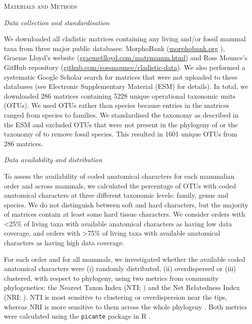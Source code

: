 \documentclass[12pt,letterpaper]{article}
\renewcommand{\section}[1]{%
\bigskip
\begin{center}
\begin{Large}
\normalfont\scshape #1
\medskip
\end{Large}
\end{center}}
\renewcommand{\subsection}[1]{%
\bigskip
\begin{center}
\begin{large}
\normalfont\itshape #1
\end{large}
\end{center}}
\begin{document}
\section{Materials and Methods}
\subsection{Data collection and standardisation}
We downloaded all cladistic%
 matrices containing any living and/or fossil mammal taxa from three major public databases: MorphoBank (\url{morphobank.org} \cite{morphobank}), Graeme Lloyd's website (\url{graemetlloyd.com/matrmamm.html}) and Ross Mounce's GitHub repository (\url{github.com/rossmounce/cladistic-data}).
We also performed a systematic Google Scholar search for matrices that were not uploaded to these databases (see Electronic Supplementary Material (ESM) for details).
In total, we downloaded 286 matrices containing 5228 unique operational taxonomic units (OTUs). 
We used OTUs rather than species because entries in the matrices ranged from species to families. 
We standardised the taxonomy as described in the ESM and excluded OTUs that were not present in the phylogeny of \cite{BinindaEmonds} or the taxonomy of \cite{wilson2005mammal} to remove fossil species.
This resulted in 1601 unique OTUs from 286 matrices.

\subsection{Data availability and distribution}
To assess the availability of coded anatomical characters for each mammalian order and across mammals, we calculated the percentage of OTUs with coded anatomical characters at three different taxonomic levels: family, genus and species.
We do not distinguish between soft and hard characters, but the majority of matrices contain at least some hard tissue characters. %
We consider orders with \textless 25\% of living taxa with available anatomical characters as having low data coverage, and orders with \textgreater 75\% of living taxa with available anatomical characters as having high data coverage. 

For each order and for all mammals, we investigated whether the available coded anatomical characters were (i) randomly distributed, (ii) overdispersed or (iii) clustered, with respect to phylogeny, using two metrics from community phylogenetics: the Nearest Taxon Index (NTI; \cite{webb2002phylogenies}) and the Net Relatedness Index (NRI; \cite{webb2002phylogenies}). 
NTI is most sensitive to clustering or overdispersion near the tips, whereas NRI is more sensitive to them across the whole phylogeny \cite{Cooper2008}. 
Both metrics were calculated using the \texttt{picante} package in R \cite{picante,R}.
\end{document}

